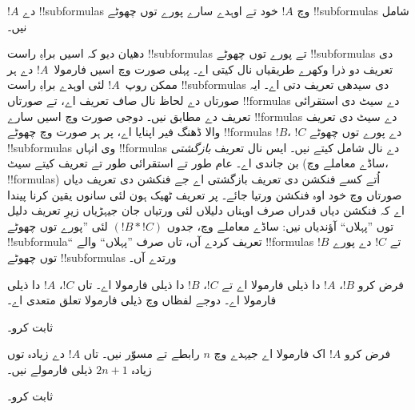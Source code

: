 \documentclass[../../../include/open-logic-section]{subfiles}
\begin{document}
\begin{defn}[!!^{subformula}]
$!A$ دے !!{subformula}s وچ $!A$ خود تے اوہدے
سارے پورے توں چھوٹے !!{subformula}s شامل نیں۔
\end{defn}

\begin{explain}
دھیان دیو کہ اسیں براہِ راست !!{subformula}s تے پورے
توں چھوٹے !!{subformula}s دی تعریف دو ذرا وکھرے
طریقیاں نال کیتی اے۔ پہلی صورت وچ اسیں فارمولا~$!A$
دے ہر ممکن روپ~$!A$ لئی اوہدے براہِ راست !!{subformula}s
دی سیدھی تعریف دتی اے۔ ایہ صورتاں دے لحاظ نال
صاف تعریف اے، تے صورتاں !!{formula}s دے سیٹ
دی استقرائی تعریف دے مطابق نیں۔ دوجی صورت وچ
اسیں سارے !!{formula}s دے سیٹ دی تعریف والا
ڈھنگ فیر اپنایا اے، پر ہر صورت وچ چھوٹے
!!{formula}s $!B$، $!C$ دے پورے توں چھوٹے
!!{subformula}s وی انہاں !!{formula}s دے نال شامل
کیتے نیں۔ ایس نال تعریف \emph{بازگشتی}
بن جاندی اے۔ عام طور تے استقرائی طور تے تعریف
کیتے سیٹ (ساڈے معاملے وچ، !!{formula}s) اُتے
کسے فنکشن دی تعریف بازگشتی اے جے فنکشن دی
تعریف دیاں صورتاں وچ خود اوہ فنکشن ورتیا جائے۔
پر تعریف ٹھیک ہون لئی سانوں یقین کرنا پیندا اے
کہ فنکشن دیاں قدراں صرف اوہناں دلیلاں لئی ورتیاں
جان جیہڑیاں زیرِ تعریف دلیل توں ”پہلاں“ آؤندیاں نیں:
ساڈے معاملے وچ، جدوں $(!B \ast !C)$ لئی
”پورے توں چھوٹے !!{subformula}“ تعریف کردے آں،
تاں صرف ”پہلاں“ والے !!{formula}s $!B$ تے $!C$
دے پورے توں چھوٹے !!{subformula}s ورتدے آں۔
\end{explain}

\begin{prop}
فرض کرو $!B$، $!A$ دا ذیلی فارمولا اے تے
$!C$، $!B$ دا ذیلی فارمولا اے۔ تاں $!C$، $!A$
دا ذیلی فارمولا اے۔ دوجے لفظاں وچ ذیلی فارمولا
تعلق متعدی اے۔
\end{prop}

\begin{prob}
 ثابت کرو۔
\end{prob}

\begin{prop}
فرض کرو $!A$ اک فارمولا اے جیہدے وچ $n$ رابطے
تے مسوّر نیں۔ تاں $!A$ دے زیادہ توں زیادہ $2n+1$
ذیلی فارمولے نیں۔
\end{prop}

\begin{prob}
 ثابت کرو۔
\end{prob}
\end{document}

